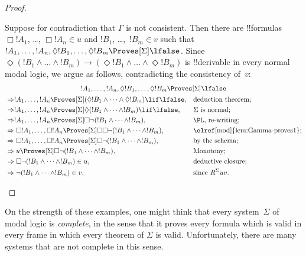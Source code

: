 \documentclass[../../../include/open-logic-section]{subfiles}
\begin{document}
\begin{proof}
\begin{enumerate}
    Suppose for contradiction that $\Gamma$ is not consistent. Then
    there are !!{formula}s $\Box!A_1$, \dots, $\Box!A_n \in u$ and $!B_1$,
    \dots,~$!B_m \in v$ such that $!A_1, \dots, !A_n, \Diamond!B_1,
    \dots, \Diamond!B_m \Proves[\Sigma] \lfalse$. Since $\Diamond
    (!B_1 \land \dots \land !B_m) \to (\Diamond!B_1 \land \dots \land
    \Diamond!B_m)$ is !!{derivable} in every normal modal logic, we
    argue as follows, contradicting the consistency of~$v$:
    \begin{multline*}
      !A_1, \dots, !A_n, \Diamond!B_1, \dots,
      \Diamond!B_m\Proves[\Sigma] \lfalse \\
    \begin{aligned}
      & \Rightarrow
      !A_1, \dots,!A_n \Proves[\Sigma] (\Diamond!B_1 \land
      \dots \land \Diamond!B_m) \lif \lfalse,
      && \text{deduction theorem;} \\
      & \Rightarrow !A_1, \dots,!A_n \Proves[\Sigma]
      \Diamond(!B_1 \land
      \dots \land !B_m) \lif \lfalse, && \Sigma \text{ is normal}; \\
      & \Rightarrow !A_1, \dots,!A_n \Proves[\Sigma]
      \Box \lnot (!B_1 \land \dots \land !B_m), && \text{\PL, re-writing}; \\
      & \Rightarrow \Box!A_1, \dots,\Box!A_n
      \Proves[\Sigma] \Box\Box \lnot (!B_1 \land \dots \land !B_m), &&
      \text{\olref[mod]{lem:Gamma-proves1}}; \\
      & \Rightarrow \Box!A_1, \dots,\Box!A_n
      \Proves[\Sigma]
      \Box\lnot (!B_1 \land \dots \land !B_m), && \text{by the
        schema}; \\
      & \Rightarrow u \Proves[\Sigma]
      \Box\lnot (!B_1 \land \dots \land !B_m), && \text{Monotony}; \\
      & \Rightarrow 
      \Box\lnot (!B_1 \land \dots \land !B_m) \in u, && \text{deductive closure}; \\
      & \Rightarrow 
      \lnot (!B_1 \land \dots \land !B_m) \in v, && \text{since }
      R^\Sigma uv. \qedhere
    \end{aligned}
    \end{multline*}
  \end{enumerate}
\end{proof}

On the strength of these examples, one might think that every
system~$\Sigma$ of modal logic is \emph{complete}, in the sense that
it proves every formula which is valid in every frame in which every
theorem of $\Sigma$ is valid. Unfortunately, there are many systems
that are not complete in this sense.
\end{document}
